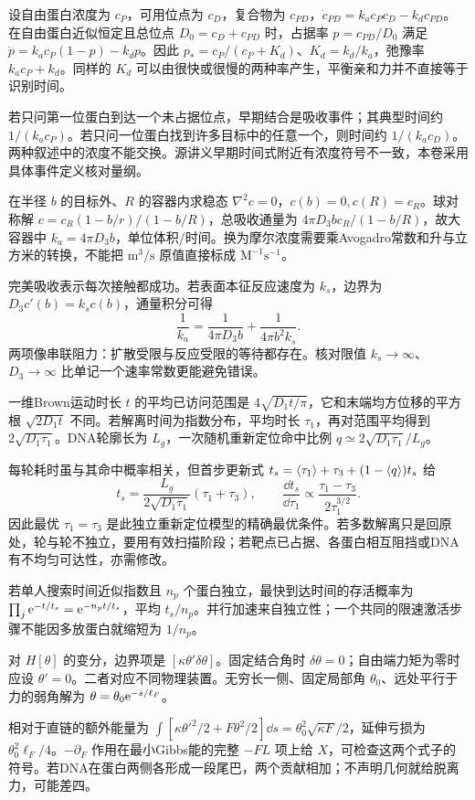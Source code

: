 设自由蛋白浓度为 $c_P$，可用位点为 $c_D$，复合物为 $c_{PD}$，$\dot c_{PD}=k_ac_Pc_D-k_dc_{PD}$。在自由蛋白近似恒定且总位点 $D_0=c_D+c_{PD}$ 时，占据率 $p=c_{PD}/D_0$ 满足 $\dot p=k_ac_P(1-p)-k_dp$。因此 $p_*=c_P/(c_P+K_d)$、$K_d=k_d/k_a$，弛豫率 $k_ac_P+k_d$。同样的 $K_d$ 可以由很快或很慢的两种率产生，平衡亲和力并不直接等于识别时间。

若只问第一位蛋白到达一个未占据位点，早期结合是吸收事件；其典型时间约 $1/(k_ac_P)$。若只问一位蛋白找到许多目标中的任意一个，则时间约 $1/(k_ac_D)$。两种叙述中的浓度不能交换。源讲义早期时间式附近有浓度符号不一致，本卷采用具体事件定义核对量纲。

在半径 $b$ 的目标外、$R$ 的容器内求稳态 $\nabla^2c=0$，$c(b)=0,c(R)=c_R$。球对称解 $c=c_R(1-b/r)/(1-b/R)$，总吸收通量为 $4\pi D_3b c_R/(1-b/R)$，故大容器中 $k_a=4\pi D_3b$，单位体积/时间。换为摩尔浓度需要乘Avogadro常数和升与立方米的转换，不能把 $\mathrm{m^3/s}$ 原值直接标成 $\mathrm{M^{-1}s^{-1}}$。

完美吸收表示每次接触都成功。若表面本征反应速度为 $k_s$，边界为 $D_3c'(b)=k_sc(b)$，通量积分可得
\[
\frac1{k_a}=\frac1{4\pi D_3b}+\frac1{4\pi b^2k_s}.
\]
两项像串联阻力：扩散受限与反应受限的等待都存在。核对限值 $k_s\to\infty$、$D_3\to\infty$ 比单记一个速率常数更能避免错误。

一维Brown运动时长 $t$ 的平均已访问范围是 $4\sqrt{D_1t/\pi}$，它和末端均方位移的平方根 $\sqrt{2D_1t}$ 不同。若解离时间为指数分布，平均时长 $\tau_1$，再对范围平均得到 $2\sqrt{D_1\tau_1}$。DNA轮廓长为 $L_g$，一次随机重新定位命中比例 $q\simeq2\sqrt{D_1\tau_1}/L_g$。

每轮耗时虽与其命中概率相关，但首步更新式 $t_s=\langle \tau_1\rangle+\tau_3+(1-\langle q\rangle)t_s$ 给
\[
t_s=\frac{L_g}{2\sqrt{D_1\tau_1}}(\tau_1+\tau_3),\qquad
\frac{\dd t_s}{\dd\tau_1}\propto\frac{\tau_1-\tau_3}{2\tau_1^{3/2}}.
\]
因此最优 $\tau_1=\tau_3$ 是此独立重新定位模型的精确最优条件。若多数解离只是回原处，轮与轮不独立，要用有效扫描阶段；若靶点已占据、各蛋白相互阻挡或DNA有不均匀可达性，亦需修改。

若单人搜索时间近似指数且 $n_p$ 个蛋白独立，最快到达时间的存活概率为 $\prod_j\mathrm e^{-t/t_s}=\mathrm e^{-n_pt/t_s}$，平均 $t_s/n_p$。并行加速来自独立性；一个共同的限速激活步骤不能因多放蛋白就缩短为 $1/n_p$。

对 $H[\theta]$ 的变分，边界项是 $[\kappa\theta'\delta\theta]$。固定结合角时 $\delta\theta=0$；自由端力矩为零时应设 $\theta'=0$。二者对应不同物理装置。无穷长一侧、固定局部角 $\theta_0$、远处平行于力的弱角解为 $\theta=\theta_0\mathrm e^{-s/\ell_F}$。

相对于直链的额外能量为 $\int[\kappa\theta'^2/2+F\theta^2/2]\dd s=\theta_0^2\sqrt{\kappa F}/2$，延伸亏损为 $\theta_0^2\ell_F/4$。$-\partial_F$ 作用在最小Gibbs能的完整 $-FL$ 项上给 $X$，可检查这两个式子的符号。若DNA在蛋白两侧各形成一段尾巴，两个贡献相加；不声明几何就给脱离力，可能差四。

